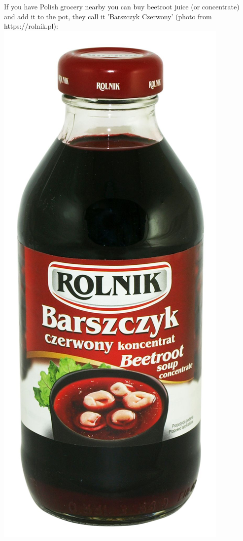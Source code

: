 \documentclass[11pt,a4paper]{article}
\begin{document}
If you have Polish grocery nearby you can buy beetroot juice (or concentrate) and add it to the pot, they call it 'Barszczyk Czerwony' (photo from https://rolnik.pl): \\
\includegraphics{15.jpg} \\
\end{document}
